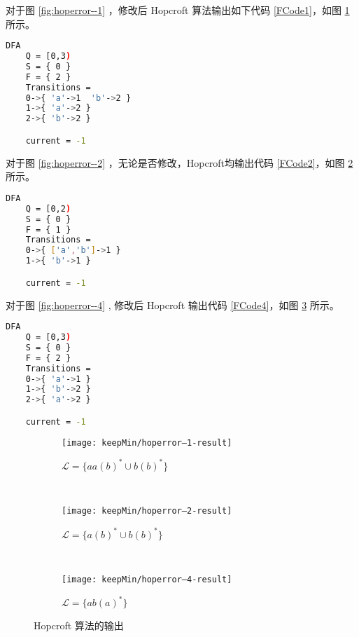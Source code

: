对于图 \ref{fig:hoperror--1} ，修改后 Hopcroft 算法输出如下代码 \ref{FCode1}，如图 \ref{fig:hoperror--1-result} 所示。

\begin{lstlisting}[language=bash,label={FCode1},caption={图 \ref{fig:hoperror--1} 输出}]
    DFA
    Q = [0,3)
    S = { 0 }
    F = { 2 }
    Transitions =
    0->{ 'a'->1  'b'->2 }
    1->{ 'a'->2 }
    2->{ 'b'->2 }

    current = -1
\end{lstlisting}
 
对于图 \ref{fig:hoperror--2} ，无论是否修改，Hopcroft均输出代码 \ref{FCode2}，如图 \ref{fig:hoperror--2-result} 所示。
\begin{lstlisting}[language=bash,label={FCode2},caption={图 \ref{fig:hoperror--2} 输出}]
    DFA
    Q = [0,2)
    S = { 0 }
    F = { 1 }
    Transitions =
    0->{ ['a','b']->1 }
    1->{ 'b'->1 }

    current = -1
\end{lstlisting}

对于图 \ref{fig:hoperror--4} , 修改后 Hopcroft 输出代码 \ref{FCode4}，如图 \ref{fig:hoperror--4-result} 所示。
\begin{lstlisting}[language=bash,label={FCode4},caption={图 \ref{fig:hoperror--4} 输出}]
    DFA
    Q = [0,3)
    S = { 0 }
    F = { 2 }
    Transitions =
    0->{ 'a'->1 }
    1->{ 'b'->2 }
    2->{ 'a'->2 }

    current = -1
\end{lstlisting}


\begin{figure}[!htbp]
    \centering
    \begin{subfigure}[b]{0.7\textwidth}
        \texttt{[image: keepMin/hoperror--1-result]}
        \caption{$\mathcal{L}=\{aa(b)^* \cup b(b)^*\}$}
        \label{fig:hoperror--1-result}
    \end{subfigure}
    \\
    \begin{subfigure}[b]{0.7\textwidth}
        \texttt{[image: keepMin/hoperror--2-result]}
        \caption{$\mathcal{L}=\{a(b)^* \cup b(b)^*\}$}
        \label{fig:hoperror--2-result}
    \end{subfigure}
    \\
    \begin{subfigure}[b]{0.7\textwidth}
        \texttt{[image: keepMin/hoperror--4-result]}
        \caption{$\mathcal{L}=\{ab(a)^*\}$}
        \label{fig:hoperror--4-result}
    \end{subfigure}
    \caption{Hopcroft 算法的输出 }
    \label{fig:hopcerror-result}
  \end{figure}

